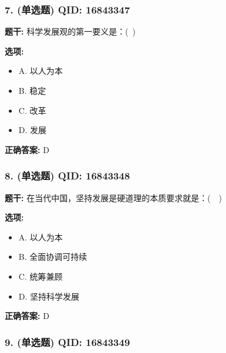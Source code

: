 \documentclass[12pt,UTF8]{ctexart}
\begin{document}
\subsubsection*{7. (单选题) \small QID: 16843347}

\textbf{题干:}
科学发展观的第一要义是：( )

\textbf{选项:}
\begin{itemize}[leftmargin=*]

  \item A. 以人为本

  \item B. 稳定

  \item C. 改革

  \item D. 发展

\end{itemize}

\textbf{正确答案:}
D

\vspace{0.3em}\hrulefill\vspace{0.7em}

\subsubsection*{8. (单选题) \small QID: 16843348}

\textbf{题干:}
在当代中国，坚持发展是硬道理的本质要求就是：(  )

\textbf{选项:}
\begin{itemize}[leftmargin=*]

  \item A. 以人为本

  \item B. 全面协调可持续

  \item C. 统筹兼顾

  \item D. 坚持科学发展

\end{itemize}

\textbf{正确答案:}
D

\vspace{0.3em}\hrulefill\vspace{0.7em}

\subsubsection*{9. (单选题) \small QID: 16843349}
\end{document}

